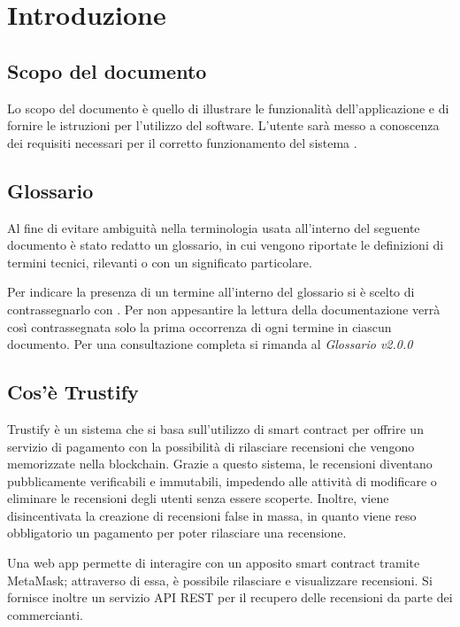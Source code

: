 \section{Introduzione}

\subsection{Scopo del documento}
Lo scopo del documento è quello di illustrare le funzionalità dell'applicazione e di fornire le istruzioni per l'utilizzo del software. L'utente sarà messo a conoscenza dei requisiti necessari per il corretto funzionamento del sistema \capName.

\subsection{Glossario}
Al fine di evitare ambiguità nella terminologia usata all'interno del seguente
documento è stato redatto un glossario, in cui vengono riportate le definizioni
di termini tecnici, rilevanti o con un significato particolare.

Per indicare
la presenza di un termine all'interno del glossario si è scelto di
contrassegnarlo con \glo . Per non appesantire la lettura della documentazione
verrà così contrassegnata solo la prima occorrenza di ogni termine in ciascun
documento.
Per una consultazione completa si rimanda al \textit{Glossario v2.0.0}

\subsection{Cos'è Trustify}
Trustify è un sistema che si basa sull'utilizzo di smart contract per offrire un servizio di pagamento con la possibilità di rilasciare recensioni che vengono memorizzate nella blockchain. Grazie a questo sistema, le recensioni diventano pubblicamente verificabili e immutabili, impedendo alle attività di modificare o eliminare le recensioni degli utenti senza essere scoperte. Inoltre, viene disincentivata la creazione di recensioni false in massa, in quanto viene reso obbligatorio un pagamento per poter rilasciare una recensione.

Una web app permette di interagire con un apposito smart contract tramite MetaMask; attraverso di essa, è possibile rilasciare e visualizzare recensioni. Si fornisce inoltre un servizio API REST per il recupero delle recensioni da parte dei commercianti.